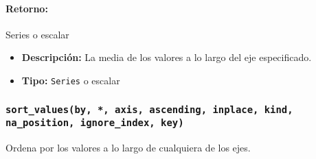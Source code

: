         \paragraph{Retorno:} Series o escalar
        \begin{itemize}
            \item \textbf{Descripción:} La media de los valores a lo largo del eje especificado.
            \item \textbf{Tipo:} \texttt{Series} o escalar
        \end{itemize}




        \subsubsection{\texttt{sort\_values(by, *, axis, ascending, inplace, kind, na\_position, ignore\_index, key)}} Ordena por los valores a lo largo de cualquiera de los ejes.

